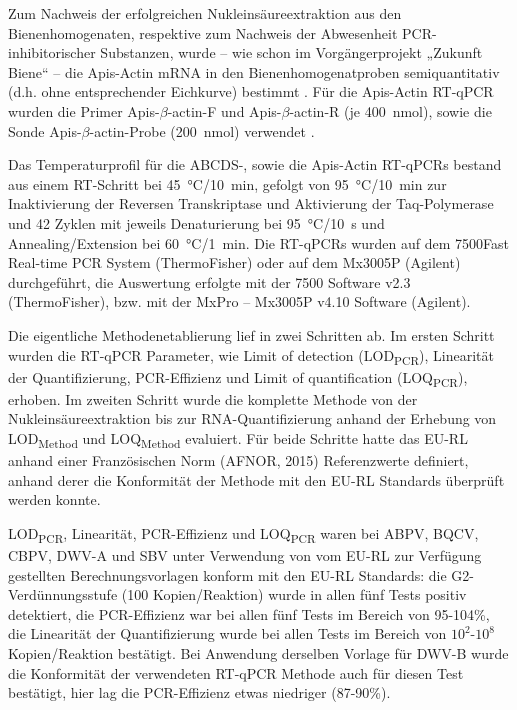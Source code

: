 Zum Nachweis der erfolgreichen Nukleinsäureextraktion aus den Bienenhomogenaten, respektive zum Nachweis der Abwesenheit PCR-inhibitorischer Substanzen, wurde – wie schon im Vorgängerprojekt „Zukunft Biene“ – die Apis-Actin mRNA in den Bienenhomogenatproben semiquantitativ (d.h. ohne entsprechender Eichkurve) bestimmt \citep{morawetz2018}. Für die Apis-Actin RT-qPCR wurden die Primer Apis-$\beta$-actin-F und Apis-$\beta$-actin-R (je \SI{400}{\nano\mol}), sowie die Sonde Apis-$\beta$-actin-Probe (\SI{200}{\nano\mol}) verwendet \citep{chen2005}.

Das Temperaturprofil für die ABCDS-, sowie die Apis-Actin RT-qPCRs bestand aus einem RT-Schritt bei \SI{45}{\degreeCelsius}/\SI{10}{\minute}, gefolgt von \SI{95}{\degreeCelsius}/\SI{10}{\minute} zur Inaktivierung der Reversen Transkriptase und Aktivierung der Taq-Polymerase und 42 Zyklen mit jeweils Denaturierung bei \SI{95}{\degreeCelsius}/\SI{10}{\second} und Annealing/Extension bei \SI{60}{\degreeCelsius}/\SI{1}{\minute}. Die RT-qPCRs wurden auf dem 7500Fast Real-time PCR System (ThermoFisher) oder auf dem Mx3005P (Agilent) durchgeführt, die Auswertung erfolgte mit der 7500 Software v2.3 (ThermoFisher), bzw. mit der MxPro – Mx3005P v4.10 Software (Agilent).

Die eigentliche Methodenetablierung lief in zwei Schritten ab. Im ersten Schritt wurden die RT-qPCR Parameter, wie Limit of detection (LOD\textsubscript{PCR}), Linearität der Quantifizierung, PCR-Effizienz und Limit of quantification (LOQ\textsubscript{PCR}), erhoben. Im zweiten Schritt wurde die komplette Methode von der Nukleinsäureextraktion bis zur RNA-Quantifizierung anhand der Erhebung von LOD\textsubscript{Method} und LOQ\textsubscript{Method} evaluiert. Für beide Schritte hatte das EU-RL anhand einer Französischen Norm (AFNOR, 2015) Referenzwerte definiert, anhand derer die Konformität der Methode mit den EU-RL Standards überprüft werden konnte.

LOD\textsubscript{PCR}, Linearität, PCR-Effizienz und LOQ\textsubscript{PCR} waren bei ABPV, BQCV, CBPV, DWV-A und SBV unter Verwendung von vom EU-RL zur Verfügung gestellten Berechnungsvorlagen konform mit den EU-RL Standards: die G2-Verdünnungsstufe (100 Kopien/Reaktion) wurde in allen fünf Tests positiv detektiert, die PCR-Effizienz war bei allen fünf Tests im Bereich von 95-104\%, die Linearität der Quantifizierung wurde bei allen Tests im Bereich von $10^2$-$10^8$ Kopien/Reaktion bestätigt. Bei Anwendung derselben Vorlage für DWV-B wurde die Konformität der verwendeten RT-qPCR Methode auch für diesen Test bestätigt, hier lag die PCR-Effizienz etwas niedriger (87-90\%).

